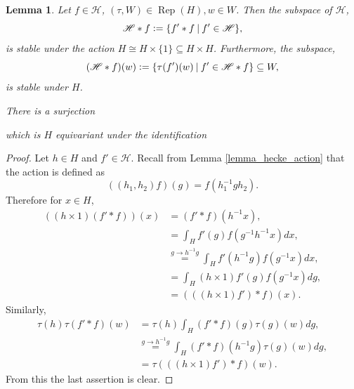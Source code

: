 \documentclass[8pt]{article}
\newtheorem{lemma}{Lemma}[section]
\DeclareMathOperator{\Rep}{Rep}
\newcommand{\defeq}{\vcentcolon=}
\newcommand{\sep}[0]{\:|\:}
\newcommand{\hecke}[0]{\mathscr{H}}
\begin{document}
\begin{lemma}
  \label{lemma_29}
  Let $f\in\hecke$, $(\tau,W)\in\Rep(H), w\in W$. Then the subspace of $\hecke$,
  \begin{equation*}
    \hecke\ast f\defeq\{f'\ast f\sep f'\in\hecke\},
  \end{equation*}
  is stable under the action $H\cong H\times\{1\}\subseteq H\times H$. Furthermore, the subspace,
  \begin{equation*}
    (\hecke\ast f)(w) \defeq \{\tau(f')(w)\sep f'\in\hecke\ast f\}\subseteq W,
  \end{equation*}
  is stable under $H$.
  \par There is a surjection 
  \begin{center}
  \end{center}
  which is $H$ equivariant under the identification 
  \begin{center}
  \end{center}
\end{lemma}

\begin{proof}
  Let $h\in H$ and $f'\in\hecke$. Recall from Lemma \ref{lemma_hecke_action} that the action is defined as 
  \begin{equation*}
    ((h_1,h_2)f)(g) = f(h_1^{-1}gh_2).
  \end{equation*}
  Therefore for $x\in H$,
  \begin{align*}
    ((h\times 1)(f'\ast f))(x)  &=(f'\ast f)(h^{-1}x),\\
     &=  \int_H f'(g)f(g^{-1}h^{-1}x)dx,\\
     &\stackrel{g\to h^{-1}g}{=} \int_H f'(h^{-1}g)f(g^{-1}x)dx,\\
     & =\int_H (h\times 1)f'(g)f(g^{-1}x)dg,\\
     & = (((h\times 1)f')\ast f)(x).
  \end{align*}
  Similarly, 
  \begin{align*}
    \tau(h)\tau(f'\ast f)(w) & = \tau(h)\int_H(f'\ast f)(g)\tau(g)(w)dg,\\
    & \stackrel{g\to h^{-1}g}{=} \int_H(f'\ast f)(h^{-1}g)\tau(g)(w)dg,\\
    & = \tau(((h\times 1)f')\ast f)(w).
  \end{align*}
  From this the last assertion is clear.
\end{proof}
\end{document}
